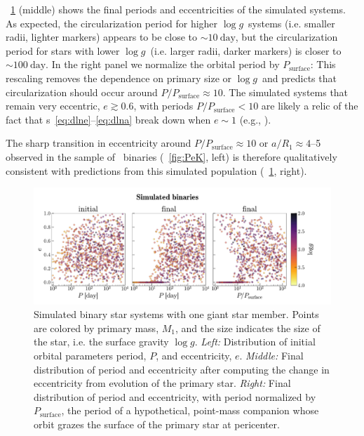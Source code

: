 \documentclass[modern, letterpaper]{aastex62}
\newcommand{\apogee}{\project{\acronym{APOGEE}}}
\newcommand{\logg}{\ensuremath{\log g}}
\newcommand{\Psurf}{\ensuremath{P_\textrm{surface}}}
\begin{document}
\figurename~\ref{fig:simulated} (middle) shows the final periods and
eccentricities of the simulated systems.
As expected, the circularization period for higher \logg\ systems (i.e. smaller
radii, lighter markers) appears to be close to $\sim 10~\textrm{day}$, but the
circularization period for stars with lower \logg\ (i.e. larger radii, darker
markers) is closer to $\sim 100~\textrm{day}$.
In the right panel we normalize the orbital period by \Psurf:
This rescaling removes the dependence on primary size or \logg\ and predicts
that circularization should occur around $P / \Psurf \approx 10$.
The simulated systems that remain very eccentric, $e \gtrsim 0.6$, with periods
$P / \Psurf < 10$ are likely a relic of the fact that \eqname
s~\ref{eq:dlne}--\ref{eq:dlna} break down when $e \sim 1$ (e.g.,
\citealt{Hut:1981}).

The sharp transition in eccentricity around $P/\Psurf \approx 10$ or $a/R_1
\approx 4$--5 observed in the sample of \apogee\ binaries
(\figurename~\ref{fig:PeK}, left) is therefore qualitatively consistent with
predictions from this simulated population (\figurename~\ref{fig:simulated},
right).


\begin{figure}[htbp]
\begin{center}
\includegraphics[trim={0 0 1cm 0}, clip, width=\linewidth]{simulated}
\end{center}
\caption{%
Simulated binary star systems with one giant star member.
Points are colored by primary mass, $M_1$, and the size indicates the size of
the star, i.e. the surface gravity $\log g$.
\textit{Left:} Distribution of initial orbital parameters period, $P$, and
eccentricity, $e$.
\textit{Middle:} Final distribution of period and eccentricity after computing
the change in eccentricity from evolution of the primary star.
\textit{Right:} Final distribution of period and eccentricity, with period
normalized by \Psurf, the period of a hypothetical, point-mass
companion whose orbit grazes the surface of the primary star at pericenter.
\label{fig:simulated}
}
\end{figure}
\end{document}
